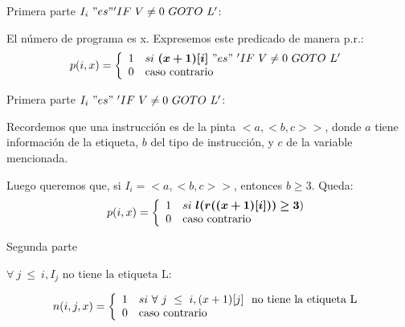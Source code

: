 \documentclass[10pt]{beamer}
\begin{document}
\begin{frame}{Primera parte}
	\color{red}$I_i\ "es" 'IF\ V \neq 0\ GOTO\ L'$\color{black}: \bigskip
	
	El número de programa es x. Expresemos este predicado de manera p.r.:
	$$p(i,x) = \left\{
    \begin{array}{c l}
     1    & si\ \bm{(x+1)[i]}\ "es"\ 'IF\ V \neq 0\ GOTO\ L' \\
	 0    & \text{caso contrario}
     
    \end{array}
    \right.
    $$ \bigskip
    
\end{frame}

\begin{frame}{Primera parte}
	\color{red}$I_i\ "es"\ 'IF\ V \neq 0\ GOTO\ L'$\color{black}: \bigskip

    Recordemos que una instrucción es de la pinta $<a,<b,c>>$, donde $a$ tiene información de la etiqueta, $b$ del tipo de instrucción, y $c$ de la variable mencionada.
    
    Luego queremos que, si $I_i = <a,<b,c>>$, entonces $b\geq 3$. Queda:
    $$p(i,x) = \left\{
    \begin{array}{c l}
     1    & si\ \bm{l(r((x+1)[i]))\geq 3}) \\
	 0    & \text{caso contrario}
     
    \end{array}
    \right.
    $$
 

\end{frame}


\begin{frame}{Segunda parte}

	\color{blue}$\forall\ j\ \leq\ i, I_j\text{ no tiene la etiqueta L}$\color{black}: \pause
	
	
	$$n(i, j, x) = \left\{
    \begin{array}{c l}
     1    & si\ \forall\ j\ \leq\ i, (x+1)[j]\ \text{ no tiene la etiqueta L} \\
	 0    & \text{caso contrario}     
    \end{array}
    \right.
    $$ \bigskip
\end{frame}
\end{document}
